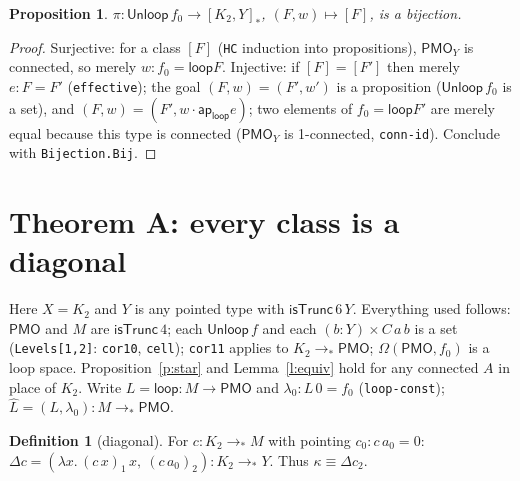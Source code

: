 \documentclass[11pt]{amsart}
\newtheorem{proposition}[theorem]{Proposition}
\theoremstyle{definition}
\newtheorem{definition}[theorem]{Definition}
\theoremstyle{remark}
\newcommand{\Om}{\Omega}
\newcommand{\code}[1]{\texttt{#1}}
\newcommand{\cT}{\mathsf{isTrunc}}
\newcommand{\lp}{\mathsf{loop}}
\newcommand{\hc}[2]{[#1,#2]_*}
\newcommand{\Unl}{\mathsf{Unloop}}
\newcommand{\PMO}{\mathsf{PMO}}
\begin{document}
\begin{proposition}\label{p:P}
$\pi:\Unl\,f_0\to\hc{K_2}{Y}$, $(F,w)\mapsto[F]$, is a bijection.
\end{proposition}
\begin{proof}
Surjective: for a class $[F]$ (\code{HC} induction into propositions),
$\PMO_Y$ is connected, so merely $w:f_0=\lp F$. Injective: if $[F]=[F']$
then merely $e:F=F'$ (\code{effective}); the goal $(F,w)=(F',w')$ is a
proposition ($\Unl\,f_0$ is a set), and $(F,w)=(F',w\cdot\mathsf{ap}_\lp e)$;
two elements of $f_0=\lp F'$ are merely equal because this type is
connected ($\PMO_Y$ is 1-connected, \code{conn-id}). Conclude with
\code{Bijection.Bij}.
\end{proof}

\section{Theorem A: every class is a diagonal}\label{sec:A}

Here $X=K_2$ and $Y$ is any pointed type with $\cT\,6\,Y$. Everything
used follows: $\PMO$ and $M$ are $\cT\,4$; each $\Unl\,f$ and each
$(b:Y)\times C\,a\,b$ is a set (\code{Levels[1,2]}: \code{cor10},
\code{cell}); \code{cor11} applies to $K_2\to_*\PMO$; $\Om(\PMO,f_0)$ is a
loop space. Proposition~\ref{p:star} and Lemma~\ref{l:equiv} hold for any
connected $A$ in place of $K_2$. Write $L=\lp:M\to\PMO$ and
$\lambda_0:L\,0=f_0$ (\code{loop-const}); $\hat L=(L,\lambda_0):M\to_*\PMO$.

\begin{definition}[diagonal]
For $c:K_2\to_*M$ with pointing $c_0:c\,a_0=0$:
$\Delta c=(\lambda x.\,(c\,x)_1\,x,\ (c\,a_0)_2):K_2\to_*Y$. Thus
$\kappa\equiv\Delta c_2$.
\end{definition}
\end{document}
